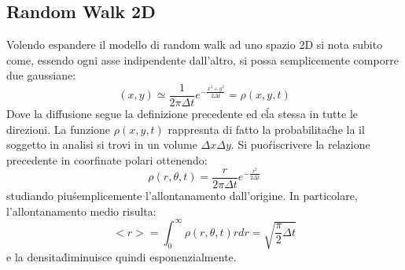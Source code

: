 \documentclass[12pt, a4paper]{book}
\theoremstyle{theorem}
\begin{document}
			\subsection{Random Walk 2D}
				Volendo espandere il modello di random walk ad uno spazio 2D si nota subito come, essendo ogni asse indipendente dall'altro, si possa semplicemente comporre due gaussiane:\\
				\begin{equation*}
					(x,y)\simeq\frac{1}{2\pi\Delta t}e^{-\frac{x^2+y^2}{2\Delta t}}=\rho(x,y,t)
				\end{equation*}
				Dove la diffusione segue la definizione precedente ed e\' la stessa in tutte le direzioni.
				La funzione $\rho(x,y,t)$ rappresnta di fatto la probabilita\' che la il soggetto in analisi si trovi in un volume $\Delta x\Delta y$.
				Si puo\' riscrivere la relazione precedente in coorfinate polari ottenendo:
				\begin{equation*}
					\rho(r,\theta,t)=\frac{r}{2\pi\Delta t}e^{-\frac{r^2}{2\Delta t}}
				\end{equation*}
				studiando piu\' semplicemente l'allontanamento dall'origine.
				In particolare, l'allontanamento medio risulta:
				\begin{equation*}
					<r>=\int_0^\infty\rho(r,\theta,t)rdr=\sqrt{\frac{\pi}{2}\Delta t}
				\end{equation*}
				e la densita\' diminuisce quindi esponenzialmente.
\end{document}
